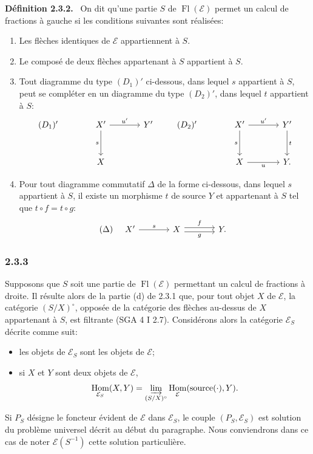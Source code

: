 \documentclass[11pt]{article}
\newenvironment{statement}[1]{\par\medskip\noindent\textbf{#1.}\ }{\par\medskip}
\DeclareMathOperator{\Hom}{Hom}
\providecommand{\Hom}{\operatorname{Hom}}
\providecommand{\Fl}{\operatorname{Fl}}
\providecommand{\cE}{\mathcal E}
\providecommand{\source}{\operatorname{source}}
\providecommand{\Hom}{\operatorname{Hom}}
\begin{document}
\begin{statement}{Définition 2.3.2}
On dit qu'une partie $S$ de $\Fl(\cE)$ permet un calcul de fractions à gauche si les conditions suivantes sont réalisées:
\begin{enumerate}[label=(\alph*)]
\item[(a')] Les flèches identiques de $\cE$ appartiennent à $S$.
\item[(b')] Le composé de deux flèches appartenant à $S$ appartient à $S$.
\item[(c')] Tout diagramme du type $(D_1)'$ ci-dessous, dans lequel $s$ appartient à $S$, peut se compléter en un diagramme du type $(D_2)'$, dans lequel $t$ appartient à $S$:
\[
\begin{tikzcd}[column sep=large,row sep=large]
(D_1)'& X' \arrow[r,"u'"] \arrow[d,"s"'] & Y'\\
& X
\end{tikzcd}
\qquad
\begin{tikzcd}[column sep=large,row sep=large]
(D_2)'& X' \arrow[r,"u'"] \arrow[d,"s"'] & Y' \arrow[d,"t"]\\
& X \arrow[r,"u"'] & Y .
\end{tikzcd}
\]
\item[(d')] Pour tout diagramme commutatif $\Delta$ de la forme ci-dessous, dans lequel $s$ appartient à $S$, il existe un morphisme $t$ de source $Y$ et appartenant à $S$ tel que $t\circ f=t\circ g$:
\[
(\Delta)\quad
\begin{tikzcd}[column sep=large]
X' \arrow[r,"s"] & X \arrow[r,shift left,"f"] \arrow[r,shift right,"g"'] & Y .
\end{tikzcd}
\]
\end{enumerate}
\end{statement}

\subsubsection*{2.3.3}
Supposons que $S$ soit une partie de $\Fl(\cE)$ permettant un calcul de fractions à droite. Il résulte alors de la partie (d) de 2.3.1 que, pour tout objet $X$ de $\cE$, la catégorie $(S/X)^\circ$, opposée de la catégorie des flèches au-dessus de $X$ appartenant à $S$, est filtrante (SGA 4 I 2.7). Considérons alors la catégorie $\cE_S$ décrite comme suit:
\begin{itemize}
\item les objets de $\cE_S$ sont les objets de $\cE$;
\item si $X$ et $Y$ sont deux objets de $\cE$,
\[
\Hom_{\cE_S}(X,Y)=\varinjlim_{(S/X)^\circ}\Hom_{\cE}(\source(\cdot),Y).
\]
\end{itemize}
Si $P_S$ désigne le foncteur évident de $\cE$ dans $\cE_S$, le couple $(P_S,\cE_S)$ est solution du problème universel décrit au début du paragraphe. Nous conviendrons dans ce cas de noter $\cE(S^{-1})$ cette solution particulière.
\end{document}
